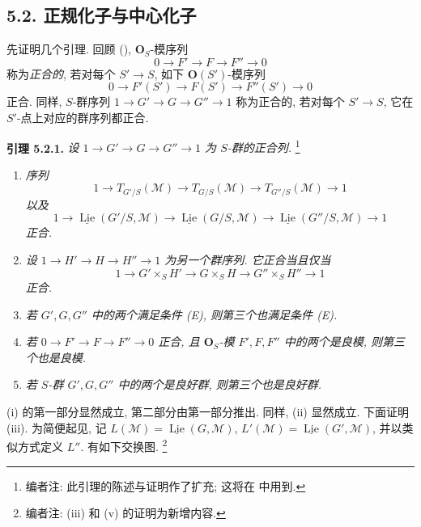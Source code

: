 \subsection*{5.2. 正规化子与中心化子}

先证明几个引理. 回顾 (),
\(\mathbf O_S\)-模序列
\[
 0\longrightarrow F'\longrightarrow F\longrightarrow F''\longrightarrow0
\]
称为\emph{正合的}, 若对每个
\(S'\to S\), 如下 \(\mathbf O(S')\)-模序列
\[
 0\longrightarrow F'(S')\longrightarrow F(S')
  \longrightarrow F''(S')\longrightarrow0
\]
正合. 同样, \(S\)-群序列
\(1\to G'\to G\to G''\to1\) 称为正合的, 若对每个
\(S'\to S\), 它在 \(S'\)-点上对应的群序列都正合.

\medskip
\noindent{}\textbf{引理 5.2.1.}
\textit{设 \(1\to G'\to G\to G''\to1\) 为
\(S\)-群的正合列.}
\footnote{编者注: 此引理的陈述与证明作了扩充;
这将在 中用到.}
\begin{enumerate}
\renewcommand{\labelenumi}{(\roman{enumi})}
\item \textit{序列}
\[
 1\longrightarrow T_{G'/S}(\mathscr M)
 \longrightarrow T_{G/S}(\mathscr M)
 \longrightarrow T_{G''/S}(\mathscr M)\longrightarrow1
\]
\textit{以及}
\[
 1\longrightarrow\underline{\operatorname{Lie}}(G'/S,\mathscr M)
 \longrightarrow\underline{\operatorname{Lie}}(G/S,\mathscr M)
 \longrightarrow\underline{\operatorname{Lie}}(G''/S,\mathscr M)
 \longrightarrow1
\]
\textit{正合.}
\item \textit{设 \(1\to H'\to H\to H''\to1\) 为另一个群序列.
它正合当且仅当}
\[
 1\longrightarrow G'\times_S H'
 \longrightarrow G\times_S H
 \longrightarrow G''\times_S H''\longrightarrow1
\]
\textit{正合.}
\item{} \textit{若 \(G',G,G''\) 中的两个满足条件 (E), 则第三个也满足条件 (E).}
\item{} \textit{若 \(0\to F'\to F\to F''\to0\) 正合, 且
\(\mathbf O_S\)-模 \(F',F,F''\) 中的两个是良模, 则第三个也是良模.}
\item \textit{若 \(S\)-群 \(G',G,G''\) 中的两个是良好群, 则第三个也是良好群.}
\end{enumerate}

(i) 的第一部分显然成立, 第二部分由第一部分推出.
同样, (ii) 显然成立. 下面证明 (iii). 为简便起见, 记
\(L(\mathscr M)=\underline{\operatorname{Lie}}(G,\mathscr M)\),
\(L'(\mathscr M)=\underline{\operatorname{Lie}}(G',\mathscr M)\),
并以类似方式定义 \(L''\). 有如下交换图.
\footnote{编者注: (iii) 和 (v) 的证明为新增内容.}

